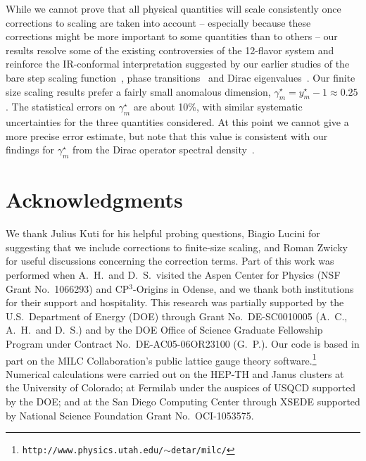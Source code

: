 \documentclass[aps,prl,twocolumn,]{revtex4}  %
\begin{document}
While we cannot prove that all physical quantities will scale consistently once corrections to scaling are taken into account -- especially because these corrections might be more important to some quantities than to others -- our results resolve some of the existing controversies of the 12-flavor system and reinforce the IR-conformal interpretation suggested by our earlier studies of the bare step scaling function~\cite{Hasenfratz:2011xn}, phase transitions~\cite{Hasenfratz:2013uha} and Dirac eigenvalues~\cite{Cheng:2013eu}.
Our finite size scaling results prefer a fairly small anomalous dimension, $\gamma_m^{\star} = y_m^{\star} - 1 \approx 0.25$.
The statistical errors on $\gamma_m^{\star}$ are about 10\%, with similar systematic uncertainties for the three quantities considered.
At this point we cannot give a more precise error estimate, but note that this value is consistent with our findings for $\gamma_m^{\star}$ from the Dirac operator spectral density~\cite{Cheng:2013eu}.


\section*{Acknowledgments} %
We thank Julius Kuti for his helpful probing questions, Biagio Lucini for suggesting that we include corrections to finite-size scaling, and Roman Zwicky for useful discussions concerning the correction terms.
Part of this work was performed when A.~H.\ and D.~S.\ visited the Aspen Center for Physics (NSF Grant No.~1066293) and CP$^3$-Origins in Odense, and we thank both institutions for their support and hospitality.
This research was partially supported by the U.S.~Department of Energy (DOE) through Grant No.~DE-SC0010005 (A.~C., A.~H.\ and D.~S.) and by the DOE Office of Science Graduate Fellowship Program under Contract No.~DE-AC05-06OR23100 (G.~P.).
Our code is based in part on the MILC Collaboration's public lattice gauge theory software.\footnote{\texttt{http://www.physics.utah.edu/$\sim$detar/milc/}}
Numerical calculations were carried out on the HEP-TH and Janus clusters at the University of Colorado; at Fermilab under the auspices of USQCD supported by the DOE; and at the San Diego Computing Center through XSEDE supported by National Science Foundation Grant No.~OCI-1053575.



{\renewcommand{\baselinestretch}{0.86} %
  
  
}
\end{document}
